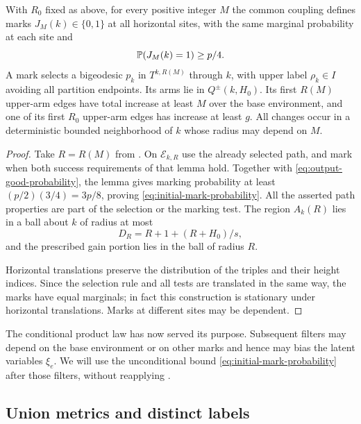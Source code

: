\begin{proposition}\label{prop:tilt-marks}
With $R_0$ fixed as above, for every positive integer $M$ the common
coupling defines marks $J_M(k)\in\{0,1\}$ at all horizontal sites, with
the same marginal probability at each site and
\begin{equation}\label{eq:initial-mark-probability}
 \mathbb P(J_M(k)=1)\geq p/4.
\end{equation}
A mark selects a bigeodesic $p_k$ in $T^{k,R(M)}$ through $k$, with
upper label $\rho_k\in I$ avoiding all partition endpoints.  Its arms
lie in $Q^\pm(k,H_0)$.  Its first $R(M)$ upper-arm edges have total
increase at least $M$ over the base environment, and one of its first
$R_0$ upper-arm edges has increase at least $g$.
All changes occur in a deterministic bounded neighborhood of $k$ whose
radius may depend on $M$.
\end{proposition}

\begin{proof}
Take $R=R(M)$ from .  On $\mathcal E_{k,R}$
use the already selected path, and mark when both success requirements
of that lemma hold.  Together with \eqref{eq:output-good-probability},
the lemma gives marking probability at least $(p/2)(3/4)=3p/8$, proving
\eqref{eq:initial-mark-probability}.  All the asserted path properties
are part of the selection or the marking test.  The region
$A_k(R)$ lies in a ball about $k$ of radius at most
\begin{equation}\label{eq:defect-radius}
 D_R=R+1+(R+H_0)/s,
\end{equation}
and the prescribed gain portion lies in the ball of radius $R$.

Horizontal translations preserve the distribution of the triples and
their height indices.  Since the selection rule and all tests are
translated in the same way, the marks have equal marginals; in fact this
construction is stationary under horizontal translations.  Marks at
different sites may be dependent.
\end{proof}

The conditional product law has now served its purpose.  Subsequent
filters may depend on the base environment or on other marks and hence
may bias the latent variables $\xi_e$.  We will use the unconditional
bound \eqref{eq:initial-mark-probability} after those filters, without
reapplying .

\subsection{Union metrics and distinct labels}
\label{sec:unions}

